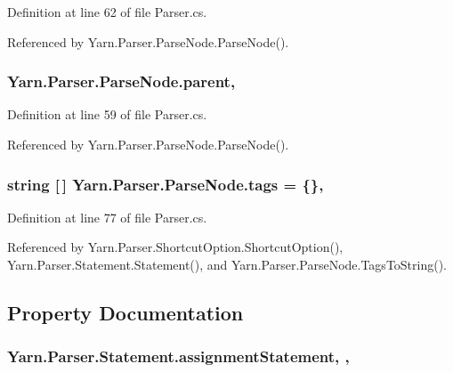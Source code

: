 Definition at line 62 of file Parser.\-cs.



Referenced by Yarn.\-Parser.\-Parse\-Node.\-Parse\-Node().

\hypertarget{a00148_af313a82103fcc2ff5a177dbb06b92f7b}{
\subsubsection[{parent}]{ Yarn.\-Parser.\-Parse\-Node.\-parent\hspace{0.3cm}{\ttfamily [package]}, {\ttfamily [inherited]}}}\label{a00148_af313a82103fcc2ff5a177dbb06b92f7b}


Definition at line 59 of file Parser.\-cs.



Referenced by Yarn.\-Parser.\-Parse\-Node.\-Parse\-Node().

\hypertarget{a00148_a58b3a15788fd2d4127d73619dc6d04ae}{
\subsubsection[{tags}]{\setlength{\rightskip}{0pt plus 5cm}string \mbox{[}$\,$\mbox{]} Yarn.\-Parser.\-Parse\-Node.\-tags = \{\}\hspace{0.3cm}{\ttfamily [package]}, {\ttfamily [inherited]}}}\label{a00148_a58b3a15788fd2d4127d73619dc6d04ae}


Definition at line 77 of file Parser.\-cs.



Referenced by Yarn.\-Parser.\-Shortcut\-Option.\-Shortcut\-Option(), Yarn.\-Parser.\-Statement.\-Statement(), and Yarn.\-Parser.\-Parse\-Node.\-Tags\-To\-String().



\subsection{Property Documentation}
\hypertarget{a00166_a7fa97a80f1b9313bc2bd4194e3f75759}{
\subsubsection[{assignment\-Statement}]{ Yarn.\-Parser.\-Statement.\-assignment\-Statement\hspace{0.3cm}{\ttfamily [get]}, {\ttfamily [set]}, {\ttfamily [package]}}}\label{a00166_a7fa97a80f1b9313bc2bd4194e3f75759}



